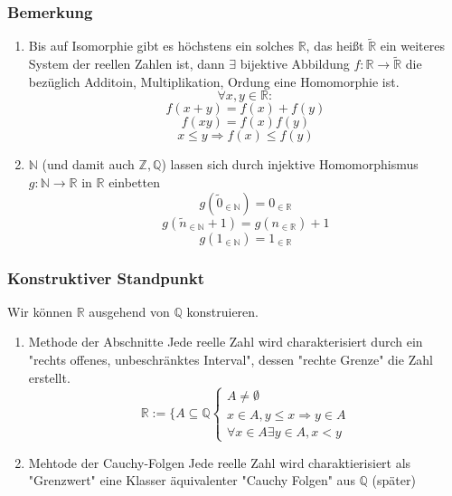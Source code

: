 \documentclass[11pt]{article}
\DeclareMathOperator{\Forall}{\forall}%
\begin{document}
\subsubsection{Bemerkung}
\label{sec-2-9-3}
\begin{enumerate}
\item Bis auf Isomorphie gibt es höchstens ein solches $\mathbb{R}$, das heißt $\tilde{\mathbb{R}}$ ein weiteres System der reellen Zahlen ist, dann $\exists$ bijektive Abbildung $f:\mathbb{R}\to\tilde{\mathbb{R}}$ die bezüglich Additoin, Multiplikation, Ordung eine Homomorphie ist.
\[\Forall x,y\in \mathbb{R}:\]
\[f(x+y) = f(x) + f(y)\]
\[f(x y) = f(x) f(y)\]
\[x\leq y \Rightarrow f(x) \leq f(y)\]
\item $\mathbb{N}$ (und damit auch $\mathbb{Z},\mathbb{Q}$) lassen sich durch injektive Homomorphismus $g:\mathbb{N}\to\mathbb{R}$ in $\mathbb{R}$ einbetten
\[g(\tilde{0}_{\in\mathbb{N}}) = 0_{\in\mathbb{R}}\]
\[g(\tilde{n}_{\in\mathbb{N}} + 1) = g(n_{\in\mathbb{R}}) + 1\]
\[g(1_{\in\mathbb{N}}) = 1_{\in\mathbb{R}}\]
\end{enumerate}
\subsubsection{Konstruktiver Standpunkt}
\label{sec-2-9-4}
Wir können $\mathbb{R}$ ausgehend von $\mathbb{Q}$ konstruieren.
\begin{enumerate}
\item Methode der Abschnitte
\label{sec-2-9-4-1}
Jede reelle Zahl wird charakterisiert durch ein "rechts offenes, unbeschränktes Interval", dessen "rechte Grenze" die Zahl erstellt.
\[\mathbb{R}:=\{A\subseteq \mathbb{Q}\begin{cases}A\neq\emptyset \\ x\in A, y\leq x\Rightarrow y\in A \\ \Forall x\in A\exists y\in A, x<y\end{cases}\]
\item Mehtode der Cauchy-Folgen
\label{sec-2-9-4-2}
Jede reelle Zahl wird charaktierisiert als "Grenzwert" eine Klasser äquivalenter "Cauchy Folgen" aus $\mathbb{Q}$ (später)
\end{enumerate}
\end{document}
